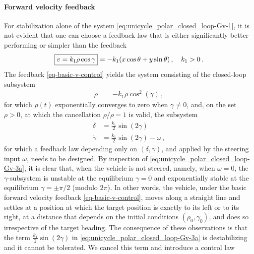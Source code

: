 \documentclass[letterpaper, 10 pt, conference]{ieeeconf}  %
\begin{document}
\paragraph{Forward velocity feedback}
\label{sec:forward_velocity_feedback}
For stabilization alone of the system \eqref{eq:unicycle_polar_closed_loop-Gv-1}, it is not evident that one can choose a feedback law that is either significantly better performing or simpler than the feedback
\begin{equation}
\label{eq-basic-v-control}
\fbox{$v =  k_1 \rho \cos\gamma$} = -k_1(x\cos\theta+y\sin\theta)\,,  \quad k_1>0\,.
\end{equation}
The feedback \eqref{eq-basic-v-control} yields the system consisting of the closed-loop subsystem 
\begin{align}
\label{eq:unicycle_polar_closed_loop-Gv-2}
\dot{\rho} &=  
- k_1 \rho \cos^2(\gamma)\,,
\end{align} 
for which $\rho(t)$ exponentially converges to zero when $\gamma\neq 0$, 
and, on the set $\rho>0$, at which the cancellation $\rho/\rho=1$ is valid, the subsystem 
\begin{subequations}
\label{eq:unicycle_polar_closed_loop-Gv-3}
\begin{align}
\dot{\delta} &=  \frac{k_1}{2} \sin(2\gamma) \label{eq:unicycle_polar_closed_loop-Gv-3n} \\
\dot{\gamma} &= \frac{k_1}{2} \sin(2\gamma) -\omega \label{eq:unicycle_polar_closed_loop-Gv-3a} \,,
\end{align} 
\end{subequations}
for which a feedback law depending only on $(\delta,\gamma)$, and applied by the steering input $\omega$, needs to be designed. 
By inspection of \eqref{eq:unicycle_polar_closed_loop-Gv-3a}, it is clear that, when the vehicle is not steered, namely, when $\omega=0$, the $\gamma$-subsystem is unstable at the equilibrium $\gamma=0$ and exponentially stable at the equilibrium $\gamma = \pm\pi/2$ (modulo $2\pi$). In other words, the vehicle, under the basic forward velocity feedback \eqref{eq-basic-v-control}, moves along a straight line and settles at a position at which the target position is exactly to its left or to its right, at a distance that depends on the initial conditions $(\rho_0,\gamma_0)$, and does so irrespective of the target heading. The consequence of these observations is that the term $\frac{k_1}{2} \sin(2\gamma)$ in \eqref{eq:unicycle_polar_closed_loop-Gv-3a} is destabilizing and it cannot be tolerated. We cancel this term and introduce a control law
\end{document}
